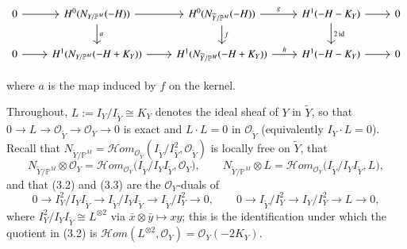 \documentclass[11pt,twoside]{amsart}
\theoremstyle{plain}
\numberwithin{equation}{section}
\theoremstyle{definition}
\begin{document}
\[
\begin{tikzcd}\label{65}
 0 \arrow[r] & H^0(N_{Y/\mathbb{P}^M}(-H)) \arrow[r] \arrow[d, "a"] & H^0(N_{\widetilde{Y}/\mathbb{P}^M}(-H)) \arrow[r, "g"] \arrow[d, "f"] & H^1(-H-K_Y) \arrow[r] \arrow[d, "2\operatorname{id}"] & 0  \\
 0 \arrow[r] & H^1(N_{Y/\mathbb{P}^M}(-H+K_Y))  \arrow[r] & H^1(N_{\widetilde{Y}/\mathbb{P}^M}(-H+K_Y)) \arrow[r, "h"] & H^1(-H-K_Y) \arrow[r] & 0
\end{tikzcd}
\]

where $a$ is the map induced by $f$ on the kernel.
\color{blue}

Throughout, $L := I_Y/I_{\widetilde Y}\cong K_Y$ denotes the ideal sheaf of $Y$ in
$\widetilde Y$, so that $0\to L\to\mathcal{O}_{\widetilde Y}\to\mathcal{O}_Y\to 0$ is exact
and $L\cdot L = 0$ in $\mathcal{O}_{\widetilde Y}$ (equivalently $I_Y\cdot L=0$).
Recall that $N_{\widetilde Y/\mathbb{P}^M}
=\mathcal{H}om_{\mathcal{O}_{\widetilde Y}}(I_{\widetilde Y}/I_{\widetilde Y}^2,\mathcal{O}_{\widetilde Y})$
is locally free on $\widetilde Y$, that
\[
N_{\widetilde Y/\mathbb{P}^M}\otimes\mathcal{O}_Y
  =\mathcal{H}om_{\mathcal{O}_Y}\big(I_{\widetilde Y}/I_Y I_{\widetilde Y},\mathcal{O}_Y\big),
\qquad
N_{\widetilde Y/\mathbb{P}^M}\otimes L
  =\mathcal{H}om_{\mathcal{O}_Y}\big(I_{\widetilde Y}/I_Y I_{\widetilde Y},L\big),
\]
and that (3.2) and (3.3) are the $\mathcal{O}_Y$-duals of
\[
0\to I_Y^2/I_Y I_{\widetilde Y}\to I_{\widetilde Y}/I_Y I_{\widetilde Y}\to I_{\widetilde Y}/I_Y^2\to 0,
\qquad
0\to I_{\widetilde Y}/I_Y^2\to I_Y/I_Y^2\to L\to 0,
\]
where $I_Y^2/I_Y I_{\widetilde Y}\cong L^{\otimes 2}$ via $\bar x\otimes\bar y\mapsto xy$;
this is the identification under which the quotient in (3.2) is
$\mathcal{H}om(L^{\otimes 2},\mathcal{O}_Y)=\mathcal{O}_Y(-2K_Y)$.
\end{document}

